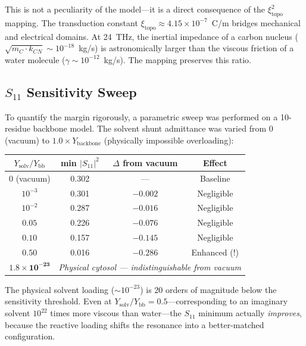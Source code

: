 This is not a peculiarity of the model---it is a direct consequence of the $\xi_\text{topo}^2$ mapping. The transduction constant $\xi_\text{topo} \approx 4.15 \times 10^{-7}$~C/m bridges mechanical and electrical domains. At 24~THz, the inertial impedance of a carbon nucleus ($\sqrt{m_C \cdot k_{CN}} \sim 10^{-18}$~kg/s) is astronomically larger than the viscous friction of a water molecule ($\gamma \sim 10^{-12}$~kg/s). The mapping preserves this ratio.

\subsection{$S_{11}$ Sensitivity Sweep}

To quantify the margin rigorously, a parametric sweep was performed on a 10-residue backbone model. The solvent shunt admittance was varied from $0$ (vacuum) to $1.0 \times Y_\text{backbone}$ (physically impossible overloading):

\begin{center}
\renewcommand{\arraystretch}{1.2}
\begin{tabular}{cccc}
\toprule
$Y_\text{solv}/Y_\text{bb}$ & min $|S_{11}|^2$ & $\Delta$ from vacuum & Effect \\
\midrule
$0$ (vacuum)         & 0.302  & ---      & Baseline \\
$10^{-3}$            & 0.301  & $-0.002$ & Negligible \\
$10^{-2}$            & 0.287  & $-0.016$ & Negligible \\
$0.05$               & 0.226  & $-0.076$ & Negligible \\
$0.10$               & 0.157  & $-0.145$ & Negligible \\
$0.50$               & 0.016  & $-0.286$ & Enhanced (!) \\
$\mathbf{1.8 \times 10^{-23}}$ & \multicolumn{3}{c}{\textit{Physical cytosol --- indistinguishable from vacuum}} \\
\bottomrule
\end{tabular}
\end{center}

The physical solvent loading ($\sim 10^{-23}$) is 20 orders of magnitude below the sensitivity threshold. Even at $Y_\text{solv}/Y_\text{bb} = 0.5$---corresponding to an imaginary solvent $10^{22}$ times more viscous than water---the $S_{11}$ minimum actually \emph{improves}, because the reactive loading shifts the resonance into a better-matched configuration.

